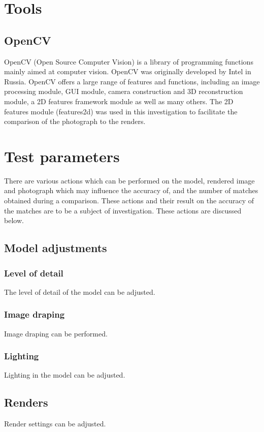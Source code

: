 \documentclass[11pt,a4paper]{report}
\begin{document}
	\section{Tools}
		\subsection{OpenCV}
			OpenCV (Open Source Computer Vision) is a library of programming functions mainly aimed at computer vision. OpenCV was originally developed by Intel in Russia. OpenCV offers a large range of features and functions, including an image processing module, GUI module, camera construction and 3D reconstruction module, a 2D features framework module as well as many others. The 2D features module (features2d) was used in this investigation to facilitate the comparison of the photograph to the renders. 

	\section{Test parameters}
		There are various actions which can be performed on the model, rendered image and photograph which may influence the accuracy of, and the number of matches obtained during a comparison. These actions and their result on the accuracy of the matches are to be a subject of investigation. These actions are discussed below.
		
		\subsection{Model adjustments}
			\subsubsection{Level of detail}
				The level of detail of the model can be adjusted.
				
			\subsubsection{Image draping}
				Image draping can be performed.
			
			\subsubsection{Lighting}
				Lighting in the model can be adjusted.
		
		\subsection{Renders}
			Render settings can be adjusted.
			
\end{document}
